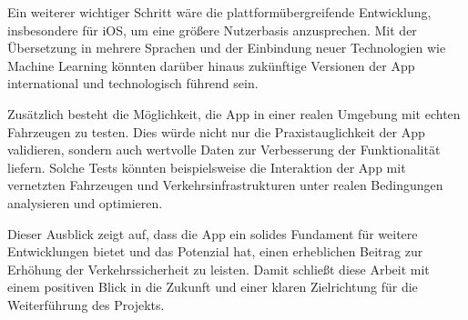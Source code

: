 \documentclass[a4paper, 12pt]{article} %
\begin{document}
\begin{spacing}{1.8}
Ein weiterer wichtiger Schritt wäre die plattformübergreifende Entwicklung, insbesondere für iOS, 
um eine größere Nutzerbasis anzusprechen. Mit der Übersetzung in mehrere
 Sprachen und der Einbindung neuer Technologien wie Machine Learning 
 könnten darüber hinaus zukünftige Versionen der App international 
 und technologisch führend sein.

Zusätzlich besteht die Möglichkeit, 
die App in einer realen Umgebung mit echten Fahrzeugen zu testen. 
Dies würde nicht nur die Praxistauglichkeit der App validieren, sondern 
auch wertvolle Daten zur Verbesserung der Funktionalität liefern. 
Solche Tests könnten beispielsweise die Interaktion der App mit 
vernetzten Fahrzeugen und Verkehrsinfrastrukturen unter realen 
Bedingungen analysieren und optimieren.

Dieser Ausblick zeigt auf, dass die App ein 
solides Fundament für weitere Entwicklungen bietet und 
das Potenzial hat, einen erheblichen Beitrag zur Erhöhung der 
Verkehrssicherheit zu leisten. Damit schließt diese Arbeit mit 
einem positiven Blick in die Zukunft und einer klaren Zielrichtung für 
die Weiterführung des Projekts.

\end{spacing}

\clearpage
\begingroup
\renewcommand{\bibfont}{\fontsize{13pt}{12pt}\selectfont}  
\sloppy
\nocite{*}
\printbibliography
\endgroup
\end{document}
